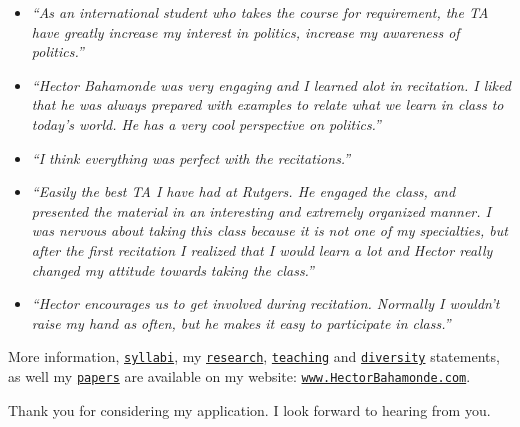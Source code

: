 {\begin{itemize}
\item \emph{``As an international student who takes the course for requirement, the TA have greatly increase my interest in politics, increase my awareness of politics.''}

\item \emph{``Hector Bahamonde was very engaging and I learned alot in recitation. I liked that he was always prepared with examples to relate what we learn in class to today's world. He has a very cool perspective on politics.''}

\item \emph{``I think everything was perfect with the recitations.''}

\item \emph{``Easily the best TA I have had at Rutgers. He engaged the class, and presented the material in an interesting and extremely organized manner. I was nervous about taking this class because it is not one of my specialties, but after the first recitation I realized that I would learn a lot and Hector really changed my attitude towards taking the class.''}

\item \emph{``Hector encourages us to get involved during recitation. Normally I wouldn't raise my hand as often, but he makes it easy to participate in class.''}

\end{itemize}

}

More information, \href{http://www.hectorbahamonde.com/teaching/}{\texttt{syllabi}}, my \href{http://github.com/hbahamonde/Job_Market/raw/master/Bahamonde_Research_Statement.pdf}{\texttt{research}}, \href{http://github.com/hbahamonde/Job_Market/raw/master/Bahamonde_Teaching_Statement.pdf}{\texttt{teaching}} and \href{http://github.com/hbahamonde/Job_Market/raw/master/Bahamonde_Diversity_Statement.pdf}{\texttt{diversity}} statements, as well my \href{http://www.hectorbahamonde.com/research/}{\texttt{papers}} are available on my website: \href{http://www.hectorbahamonde.com}{\texttt{www.HectorBahamonde.com}}. 

Thank you for considering my application. I look forward to hearing from you.

